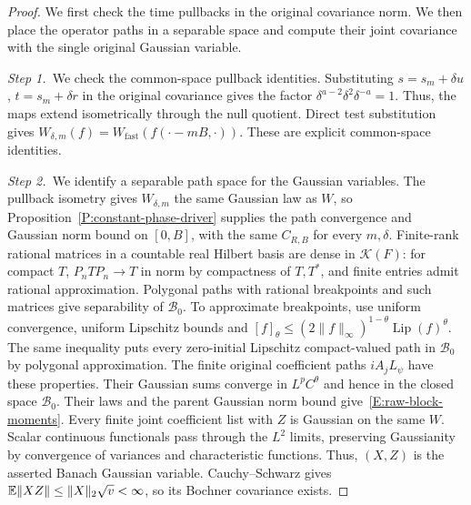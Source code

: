 \begin{proof}
  We first check the time pullbacks in the original covariance norm. We then
  place the operator paths in a separable space and compute their joint
  covariance with the single original Gaussian variable.


  \medskip
  \noindent\textit{Step 1.~}We check the common-space pullback identities.
  Substituting $s = s_m+\delta u$, $t = s_m+\delta r$ in the original covariance
  gives the factor $\delta^{a-2}\delta^2\delta^{-a} = 1$. Thus, the maps extend
  isometrically through the null quotient. Direct test substitution gives
  $W_{\delta,m}(f) = W_{\mathrm{fast}}(f(\cdot-mB,\cdot))$. These are explicit
  common-space identities.


  \medskip
  \noindent\textit{Step 2.~}We identify a separable path space for the
  Gaussian variables.
  The pullback isometry gives $W_{\delta,m}$ the same Gaussian law as $W$, so
  Proposition~\ref{P:constant-phase-driver} supplies the path convergence and
  Gaussian norm bound on $[0,B]$, with the same $C_{R,B}$ for every
  $m,\delta$.
  Finite-rank rational matrices in a countable real Hilbert basis are dense in
  $\mathcal{K}(F)$: for compact $T$, $P_nTP_n \to T$ in norm by compactness of
  $T,T^*$, and finite entries admit rational approximation. Polygonal paths with
  rational breakpoints and such matrices give separability of $\mathscr{B}_0$.
  To approximate breakpoints, use uniform convergence, uniform Lipschitz bounds
  and $[f]_\theta \le (2\|f\|_\infty)^{1-\theta}\operatorname{Lip}(f)^\theta$.
  The same inequality puts every zero-initial Lipschitz compact-valued path in
  $\mathscr{B}_0$ by polygonal approximation. The finite original coefficient
  paths $iA_jL_\psi$ have these properties. Their Gaussian sums converge in
  $L^pC^\theta$ and hence in the closed space $\mathscr{B}_0$. Their laws and
  the parent Gaussian norm bound give~\eqref{E:raw-block-moments}. Every finite
  joint coefficient list with $Z$ is Gaussian on the same $W$. Scalar continuous
  functionals pass through the $L^2$ limits, preserving Gaussianity by
  convergence of variances and characteristic functions. Thus, $(X,Z)$ is the
  asserted Banach Gaussian variable. Cauchy--Schwarz gives $\mathbb{E}\|XZ\| \le
  \|X\|_2\sqrt v < \infty$, so its Bochner covariance exists.



\end{proof}
